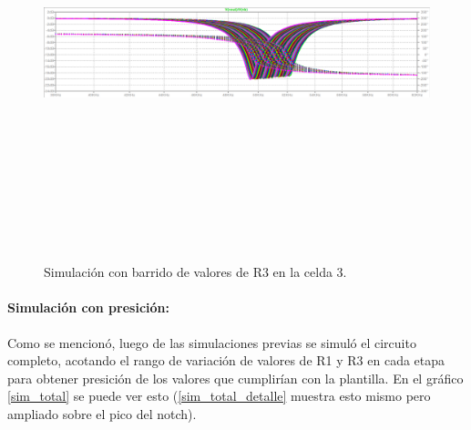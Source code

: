  \begin{figure}[H] %
	\centering	\includegraphics[width=12cm,height=12cm,keepaspectratio]{../EJ4/graficos/etapa3_R3.png}
	\caption{Simulaci\'on con barrido de valores de R3 en la celda 3.}
	\label{celda3_r3}
\end{figure}

\paragraph{Simulaci\'on con presici\'on:}
Como se mencion\'o, luego de las simulaciones previas se simul\'o el circuito completo, acotando el rango de variaci\'on de valores de R1 y R3 en cada etapa para obtener presici\'on de los valores que cumplir\'ian con la plantilla. En el gr\'afico \ref{sim_total} se puede ver esto (\ref{sim_total_detalle} muestra esto mismo pero ampliado sobre el pico del notch).

